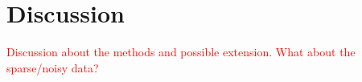 \section{Discussion} %
\label{sec:discussion}

\textcolor{red}{Discussion about the methods and possible extension. What about the sparse/noisy data?}

